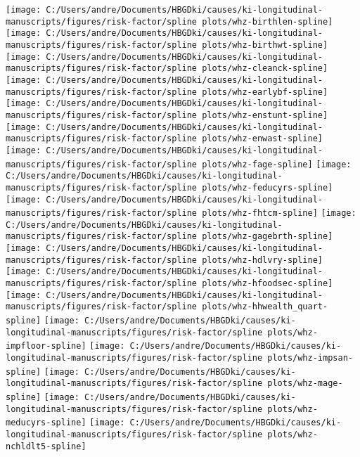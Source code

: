 \documentclass[9pt,]{book}
\begin{document}
\texttt{[image: C:/Users/andre/Documents/HBGDki/causes/ki-longitudinal-manuscripts/figures/risk-factor/spline plots/whz-birthlen-spline]}
\texttt{[image: C:/Users/andre/Documents/HBGDki/causes/ki-longitudinal-manuscripts/figures/risk-factor/spline plots/whz-birthwt-spline]}
\texttt{[image: C:/Users/andre/Documents/HBGDki/causes/ki-longitudinal-manuscripts/figures/risk-factor/spline plots/whz-cleanck-spline]}
\texttt{[image: C:/Users/andre/Documents/HBGDki/causes/ki-longitudinal-manuscripts/figures/risk-factor/spline plots/whz-earlybf-spline]}
\texttt{[image: C:/Users/andre/Documents/HBGDki/causes/ki-longitudinal-manuscripts/figures/risk-factor/spline plots/whz-enstunt-spline]}
\texttt{[image: C:/Users/andre/Documents/HBGDki/causes/ki-longitudinal-manuscripts/figures/risk-factor/spline plots/whz-enwast-spline]}
\texttt{[image: C:/Users/andre/Documents/HBGDki/causes/ki-longitudinal-manuscripts/figures/risk-factor/spline plots/whz-fage-spline]}
\texttt{[image: C:/Users/andre/Documents/HBGDki/causes/ki-longitudinal-manuscripts/figures/risk-factor/spline plots/whz-feducyrs-spline]}
\texttt{[image: C:/Users/andre/Documents/HBGDki/causes/ki-longitudinal-manuscripts/figures/risk-factor/spline plots/whz-fhtcm-spline]}
\texttt{[image: C:/Users/andre/Documents/HBGDki/causes/ki-longitudinal-manuscripts/figures/risk-factor/spline plots/whz-gagebrth-spline]}
\texttt{[image: C:/Users/andre/Documents/HBGDki/causes/ki-longitudinal-manuscripts/figures/risk-factor/spline plots/whz-hdlvry-spline]}
\texttt{[image: C:/Users/andre/Documents/HBGDki/causes/ki-longitudinal-manuscripts/figures/risk-factor/spline plots/whz-hfoodsec-spline]}
\texttt{[image: C:/Users/andre/Documents/HBGDki/causes/ki-longitudinal-manuscripts/figures/risk-factor/spline plots/whz-hhwealth\_quart-spline]}
\texttt{[image: C:/Users/andre/Documents/HBGDki/causes/ki-longitudinal-manuscripts/figures/risk-factor/spline plots/whz-impfloor-spline]}
\texttt{[image: C:/Users/andre/Documents/HBGDki/causes/ki-longitudinal-manuscripts/figures/risk-factor/spline plots/whz-impsan-spline]}
\texttt{[image: C:/Users/andre/Documents/HBGDki/causes/ki-longitudinal-manuscripts/figures/risk-factor/spline plots/whz-mage-spline]}
\texttt{[image: C:/Users/andre/Documents/HBGDki/causes/ki-longitudinal-manuscripts/figures/risk-factor/spline plots/whz-meducyrs-spline]}
\texttt{[image: C:/Users/andre/Documents/HBGDki/causes/ki-longitudinal-manuscripts/figures/risk-factor/spline plots/whz-nchldlt5-spline]}
\end{document}
